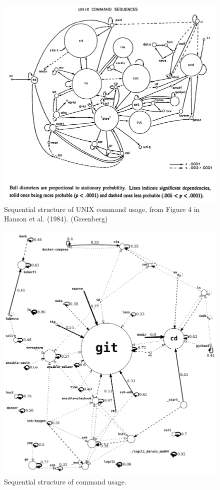 \documentclass[thesis=M,english]{FITthesis}[2012/10/20]
\newcommand{\tmpframe}[1]{\fbox{#1}}
\renewcommand{\tmpframe}[1]{#1}
\begin{document}
\begin{figure}
  \tmpframe{\includegraphics[width=\linewidth]{figures/greenberg/graph_ref_cmd-sequences.png}}
  \caption{Sequential structure of UNIX command usage, from Figure 4
in Hanson et al. (1984). (Greenberg)}
\end{figure}

\begin{figure}
  \tmpframe{\includegraphics[width=\linewidth]{figures/greenberg_new/graph_cmd-sequence_vit_41_0-1_crop.png}}
  \caption{Sequential structure of command usage.}
  \label{seq-graph}
\end{figure}
\end{document}
